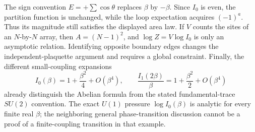 \begin{remark}\ours
The sign convention \(E=+\sum\cos\theta\) replaces \(\beta\) by \(-\beta\). Since \(I_0\) is even, the partition function is unchanged, while the loop expectation acquires \((-1)^a\). Thus its magnitude still satisfies the displayed area law. If \(V\) counts the sites of an \(N\)-by-\(N\) array, then \(A=(N-1)^2\), and \(\log Z=V\log I_0\) is only an asymptotic relation. Identifying opposite boundary edges changes the independent-plaquette argument and requires a global constraint. Finally, the different small-coupling expansions
\[
 I_0(\beta)=1+\frac{\beta^2}{4}+O(\beta^4),\qquad
 \frac{I_1(2\beta)}{\beta}=1+\frac{\beta^2}{2}+O(\beta^4)
\]
already distinguish the Abelian formula from the stated fundamental-trace \(SU(2)\) convention. The exact \(U(1)\) pressure \(\log I_0(\beta)\) is analytic for every finite real \(\beta\); the neighboring general phase-transition discussion cannot be a proof of a finite-coupling transition in that example.
\end{remark}
